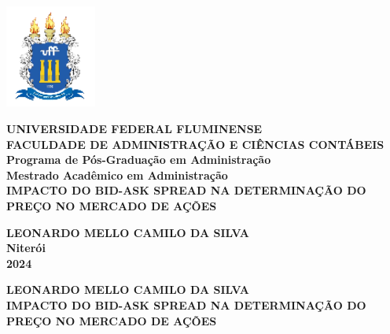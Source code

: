 



\begin{center}
    \includegraphics[angle=0,keepaspectratio,width=3cm]{UFF.png}
    \end{center}
    
    \begin{center}
    \textbf{\fontsize{12}{14}\selectfont 
    UNIVERSIDADE FEDERAL FLUMINENSE\\[0.2cm]
    FACULDADE DE ADMINISTRAÇÃO E CIÊNCIAS CONTÁBEIS\\[0.2cm]
    Programa de Pós-Graduação em Administração\\[0.2cm]
    Mestrado Acadêmico em Administração\\[4.5cm]
    IMPACTO DO BID-ASK SPREAD NA DETERMINAÇÃO DO PREÇO NO MERCADO DE AÇÕES\\[4cm]
    }
    \end{center}
    
    \begin{center}
    \textbf{LEONARDO MELLO CAMILO DA SILVA\\[5.5cm]
    Niterói\\[0.2cm]
    2024
    }
    \end{center}
    \thispagestyle{empty}
    \begin{center}
    
    \textbf{LEONARDO MELLO CAMILO DA SILVA\\[1.5cm]
            IMPACTO DO BID-ASK SPREAD NA DETERMINAÇÃO DO PREÇO NO MERCADO DE AÇÕES\\[5cm]
            }
        
       
        
        \end{center}
    
    
    \begin{quotation}
    \setlength{\leftskip}{7cm}
    \end{quotation}
    
